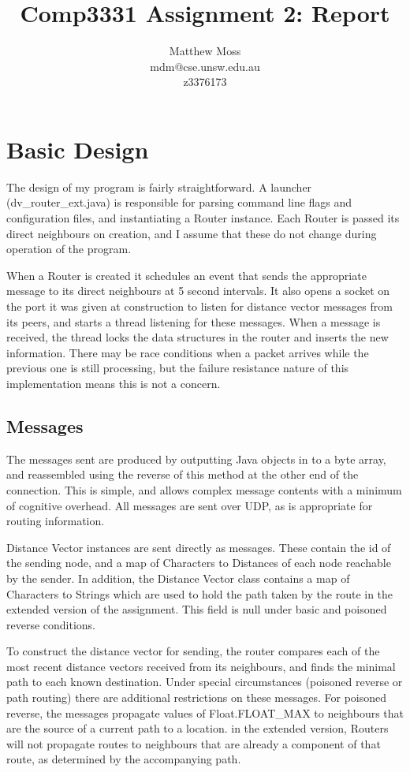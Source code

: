 \documentclass{article}
\title{Comp3331 Assignment 2: Report}
\author{Matthew Moss\\
mdm@cse.unsw.edu.au\\
z3376173}
\begin{document}
\maketitle

\section*{Basic Design}

The design of my program is fairly straightforward. A launcher (dv\_router\_ext.java) is responsible for parsing command line flags and configuration files, and instantiating a Router instance. Each Router is passed its direct neighbours on creation, and I assume that these do not change during operation of the program.

When a Router is created it schedules an event that sends the appropriate message to its direct neighbours at 5 second intervals. It also opens a socket on the port it was given at construction to listen for distance vector messages from its peers, and starts a thread listening for these messages. When a message is received, the thread locks the data structures in the router and inserts the new information. There may be race conditions when a packet arrives while the previous one is still processing, but the failure resistance nature of this implementation means this is not a concern.

\subsection*{Messages}

The messages sent are produced by outputting Java objects in to a byte array, and reassembled using the reverse of this method at the other end of the connection. This is simple, and allows complex message contents with a minimum of cognitive overhead. All messages are sent over UDP, as is appropriate for routing information.

Distance Vector instances are sent directly as messages. These contain the id of the sending node, and a map of Characters to Distances of each node reachable by the sender. In addition, the Distance Vector class contains a map of Characters to Strings which are used to hold the path taken by the route in the extended version of the assignment. This field is null under basic and poisoned reverse conditions.

To construct the distance vector for sending, the router compares each of the most recent distance vectors received from its neighbours, and finds the minimal path to each known destination. Under special circumstances (poisoned reverse or path routing) there are additional restrictions on these messages. For poisoned reverse, the messages propagate values of Float.FLOAT\_MAX to neighbours that are the source of a current path to a location. in the extended version, Routers will not propagate routes to neighbours that are already a component of that route, as determined by the accompanying path.
\end{document}
